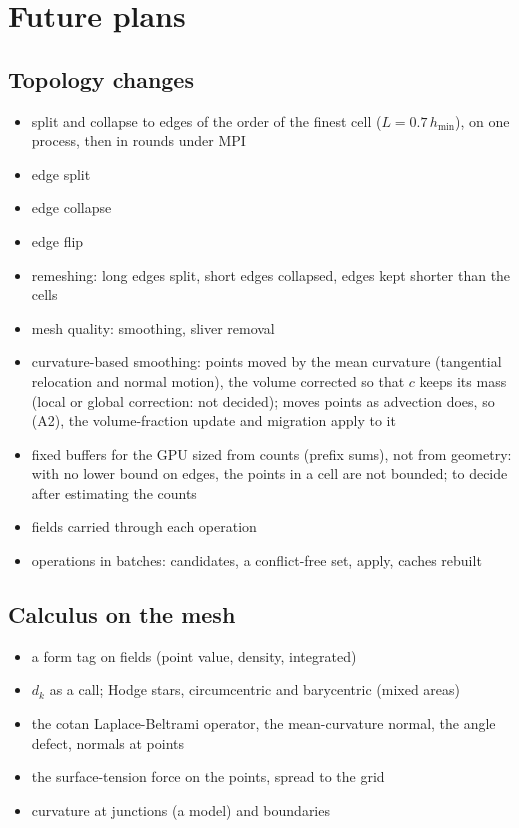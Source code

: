 \documentclass[10pt,a4paper]{article}
\theoremstyle{definition}
\begin{document}
\section{Future plans}
\label{sec:future}

\subsection*{Topology changes}
\begin{itemize}
  \item split and collapse to edges of the order of the finest cell ($L =
    0.7\,h_{\min}$), on one process, then in rounds under MPI
  \item edge split
  \item edge collapse
  \item edge flip
  \item remeshing: long edges split, short edges collapsed, edges kept
    shorter than the cells
  \item mesh quality: smoothing, sliver removal
  \item curvature-based smoothing: points moved by the mean curvature
    (tangential relocation and normal motion), the volume corrected so
    that $c$ keeps its mass (local or global correction: not decided);
    moves points as advection does, so (A2), the volume-fraction update
    and migration apply to it
  \item fixed buffers for the GPU sized from counts (prefix sums), not
    from geometry: with no lower bound on edges, the points in a cell are
    not bounded; to decide after estimating the counts
  \item fields carried through each operation
  \item operations in batches: candidates, a conflict-free set, apply,
    caches rebuilt
\end{itemize}

\subsection*{Calculus on the mesh}
\begin{itemize}
  \item a form tag on fields (point value, density, integrated)
  \item $d_k$ as a call; Hodge stars, circumcentric and barycentric
    (mixed areas)
  \item the cotan Laplace-Beltrami operator, the mean-curvature normal,
    the angle defect, normals at points
  \item the surface-tension force on the points, spread to the grid
  \item curvature at junctions (a model) and boundaries
\end{itemize}
\end{document}
